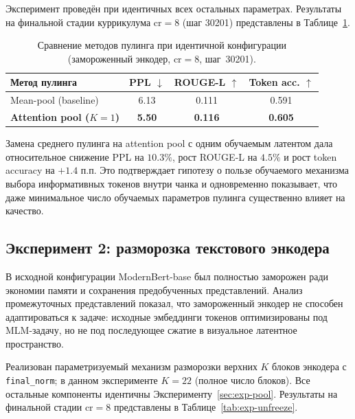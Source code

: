 \documentclass[a4paper,12pt]{extarticle}
\begin{document}
Эксперимент проведён при идентичных всех остальных параметрах. Результаты на финальной стадии куррикулума $\text{cr}=8$ (шаг 30201) представлены в Таблице~\ref{tab:exp-pool}.

\begin{table}[ht]
\centering
\caption{Сравнение методов пулинга при идентичной конфигурации (замороженный энкодер, $\text{cr}=8$, шаг~30201).}
\label{tab:exp-pool}
\begin{tabular}{lccc}
\toprule
\textbf{Метод пулинга} & \textbf{PPL} $\downarrow$ & \textbf{ROUGE-L} $\uparrow$ & \textbf{Token acc.} $\uparrow$ \\
\midrule
Mean-pool (baseline)      & 6.13 & 0.111 & 0.591 \\
\textbf{Attention pool ($K=1$)}      & \textbf{5.50} & \textbf{0.116} & \textbf{0.605} \\
\bottomrule
\end{tabular}
\end{table}

Замена среднего пулинга на attention pool с одним обучаемым латентом дала относительное снижение PPL на $10.3\%$, рост ROUGE-L на $4.5\%$ и рост token accuracy на $+1.4$ п.п. Это подтверждает гипотезу о пользе обучаемого механизма выбора информативных токенов внутри чанка и одновременно показывает, что даже минимальное число обучаемых параметров пулинга существенно влияет на качество.

\subsection{Эксперимент 2: разморозка текстового энкодера}\label{sec:exp-unfreeze}

В исходной конфигурации ModernBert-base был полностью заморожен ради экономии памяти и сохранения предобученных представлений. Анализ промежуточных представлений показал, что замороженный энкодер не способен адаптироваться к задаче: исходные эмбеддинги токенов оптимизированы под MLM-задачу, но не под последующее сжатие в визуальное латентное пространство.

Реализован параметризуемый механизм разморозки верхних $K$ блоков энкодера с \texttt{final\_norm}; в данном эксперименте $K = 22$ (полное число блоков). Все остальные компоненты идентичны Эксперименту~\ref{sec:exp-pool}. Результаты на финальной стадии $\text{cr}=8$ представлены в Таблице~\ref{tab:exp-unfreeze}.
\end{document}

